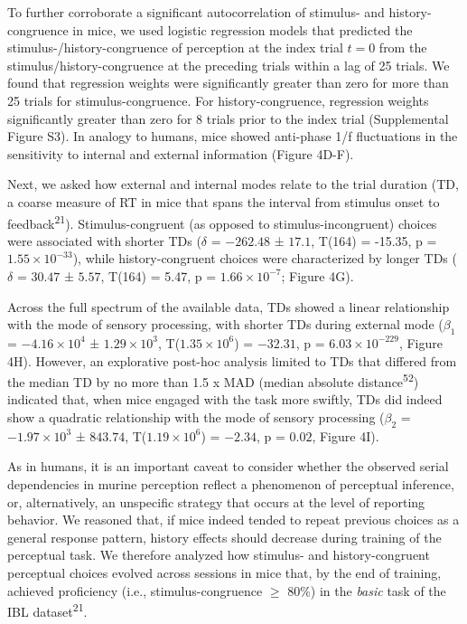 \documentclass[
]{article}
\begin{document}
To further corroborate a significant autocorrelation of stimulus- and
history-congruence in mice, we used logistic regression models that
predicted the stimulus-/history-congruence of perception at the index
trial \(t = 0\) from the stimulus/history-congruence at the preceding
trials within a lag of 25 trials. We found that regression weights were
significantly greater than zero for more than 25 trials for
stimulus-congruence. For history-congruence, regression weights
significantly greater than zero for 8 trials prior to the index trial
(Supplemental Figure S3). In analogy to humans, mice showed anti-phase
1/f fluctuations in the sensitivity to internal and external information
(Figure 4D-F).

Next, we asked how external and internal modes relate to the trial
duration (TD, a coarse measure of RT in mice that spans the interval
from stimulus onset to feedback\textsuperscript{21}). Stimulus-congruent
(as opposed to stimulus-incongruent) choices were associated with
shorter TDs (\(\delta\) = \(-262.48\) ± \(17.1\), T(164) = -15.35, p =
\(\ensuremath{1.55\times 10^{-33}}\)), while history-congruent choices
were characterized by longer TDs (\(\delta\) = \(30.47\) ± \(5.57\),
T(164) = 5.47, p = \(\ensuremath{1.66\times 10^{-7}}\); Figure 4G).

Across the full spectrum of the available data, TDs showed a linear
relationship with the mode of sensory processing, with shorter TDs
during external mode (\(\beta_1\) = \(\ensuremath{-4.16\times 10^{4}}\)
± \(\ensuremath{1.29\times 10^{3}}\),
T(\(\ensuremath{1.35\times 10^{6}}\)) = \(-32.31\), p =
\(\ensuremath{6.03\times 10^{-229}}\), Figure 4H). However, an
explorative post-hoc analysis limited to TDs that differed from the
median TD by no more than 1.5 x MAD (median absolute
distance\textsuperscript{52}) indicated that, when mice engaged with the
task more swiftly, TDs did indeed show a quadratic relationship with the
mode of sensory processing (\(\beta_2\) =
\(\ensuremath{-1.97\times 10^{3}}\) ± \(843.74\),
T(\(\ensuremath{1.19\times 10^{6}}\)) = \(-2.34\), p = \(0.02\), Figure
4I).

As in humans, it is an important caveat to consider whether the observed
serial dependencies in murine perception reflect a phenomenon of
perceptual inference, or, alternatively, an unspecific strategy that
occurs at the level of reporting behavior. We reasoned that, if mice
indeed tended to repeat previous choices as a general response pattern,
history effects should decrease during training of the perceptual task.
We therefore analyzed how stimulus- and history-congruent perceptual
choices evolved across sessions in mice that, by the end of training,
achieved proficiency (i.e., stimulus-congruence \(\geq\) 80\%) in the
\emph{basic} task of the IBL dataset\textsuperscript{21}.
\end{document}
